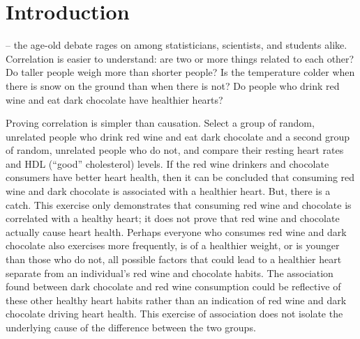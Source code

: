 \chapter{Introduction}
\label{introduction}

 -- the age-old debate rages on among statisticians, scientists, and students alike.  Correlation is easier to understand: are two or more things related to each other?  Do taller people weigh more than shorter people?  Is the temperature colder when there is snow on the ground than when there is not?  Do people who drink red wine and eat dark chocolate have healthier hearts? 

Proving correlation is simpler than causation.  Select a group of random, unrelated people who drink red wine and eat dark chocolate and a second group of random, unrelated people who do not, and compare their resting heart rates and HDL (``good'' cholesterol) levels.  If the red wine drinkers and chocolate consumers have better heart health, then it can be concluded that consuming red wine and dark chocolate is associated with a healthier heart.  But, there is a catch.  This exercise only demonstrates that consuming red wine and chocolate is correlated with a healthy heart; it does not prove that red wine and chocolate actually cause heart health.  Perhaps everyone who consumes red wine and dark chocolate also exercises more frequently, is of a healthier weight, or is younger than those who do not, all possible factors that could lead to a healthier heart separate from an individual's red wine and chocolate habits.  The association found between dark chocolate and red wine consumption could be reflective of these other healthy heart habits rather than an indication of red wine and dark chocolate driving heart health.  This exercise of association does not isolate the underlying cause of the difference between the two groups. 
 
